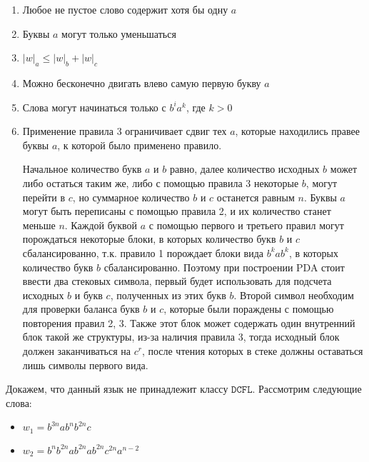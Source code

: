 \documentclass[a4paper, 14pt]{article}
\begin{document}
\begin{enumerate}
  \item Любое не пустое слово содержит хотя бы одну $a$
  \item Буквы $a$ могут только уменьшаться
  \item $|w|_a \leq |w|_b + |w|_c$
  \item Можно бесконечно двигать влево самую первую букву $a$
  \item Слова могут начинаться только с $b^i a^k$, где $k > 0$
  \item Применение правила 3 ограничивает сдвиг тех $a$, которые находились правее буквы $a$, к которой было применено правило.

    
Начальное количество букв $a$ и $b$ равно, далее количество исходных $b$ может либо остаться таким же, либо с помощью правила 3 некоторые $b$, могут перейти в $c$, но суммарное количество $b$ и $c$ останется равным $n$. Буквы $a$ могут быть переписаны с помощью правила 2, и их количество станет меньше $n$. Каждой буквой $a$ с помощью первого и третьего правил могут порождаться некоторые блоки, в которых количество букв $b$ и $c$ сбалансированно, т.к. правило 1 порождает блоки вида $b^k a b^k$, в которых количество букв $b$ сбалансированно. Поэтому при построении PDA стоит ввести два стековых символа, первый будет использовать для подсчета исходных $b$ и букв $c$, полученных из этих букв $b$. Второй символ необходим для проверки баланса букв $b$ и $c$, которые были пораждены с помощью повторения правил 2, 3. Также этот блок может содержать один внутренний блок такой же структуры, из-за наличия правила 3, тогда исходный блок должен заканчиваться на $c^r$, после чтения которых в стеке должны оставаться лишь символы первого вида.







\end{enumerate}


Докажем, что данный язык не принадлежит классу $\mathtt{DCFL}$. Рассмотрим следующие слова:

%
\begin{itemize}
  \item $w_1 = b^{3n} a b^n b^{2n} c$
  \item $w_2 = b^{n} b^{2n} a b^{2n} a b^{2n} c^{2n} a^{n-2}$
\end{itemize}
\end{document}
